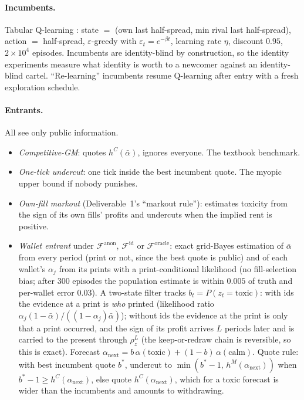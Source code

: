 \documentclass[11pt]{article}
\newcommand{\Fanon}{\mathcal{F}^{\mathrm{anon}}}
\newcommand{\Fid}{\mathcal{F}^{\mathrm{id}}}
\newcommand{\For}{\mathcal{F}^{\mathrm{oracle}}}
\begin{document}
\paragraph{Incumbents.} Tabular Q-learning \cite{calvano,cfl}: state $=$ (own last half-spread, min rival last half-spread), action $=$ half-spread, $\varepsilon$-greedy with $\varepsilon_t=e^{-\beta t}$, learning rate $\eta$, discount $0.95$, $2\times10^4$ episodes. Incumbents are identity-blind by construction, so the identity experiments measure what identity is worth to a newcomer against an identity-blind cartel. ``Re-learning'' incumbents resume Q-learning after entry with a fresh exploration schedule.

\paragraph{Entrants.} All see only public information.
\begin{itemize}
\item \emph{Competitive-GM}: quotes $h^C(\bar\alpha)$, ignores everyone. The textbook benchmark.
\item \emph{One-tick undercut}: one tick inside the best incumbent quote. The myopic upper bound if nobody punishes.
\item \emph{Own-fill markout} (Deliverable~1's ``markout rule''): estimates toxicity from the sign of its own fills' profits and undercuts when the implied rent is positive.
\item \emph{Wallet entrant} under $\Fanon$, $\Fid$ or $\For$: exact grid-Bayes estimation of $\bar\alpha$ from every period (print or not, since the best quote is public) and of each wallet's $\alpha_j$ from its prints with a print-conditional likelihood (no fill-selection bias; after 300 episodes the population estimate is within $0.005$ of truth and per-wallet error $0.03$). A two-state filter tracks $b_t=P(z_t=\text{toxic})$: with ids the evidence at a print is \emph{who} printed (likelihood ratio $\alpha_j(1-\bar\alpha)/((1-\alpha_j)\bar\alpha)$); without ids the evidence at the print is only that a print occurred, and the sign of its profit arrives $L$ periods later and is carried to the present through $\rho_z^{L}$ (the keep-or-redraw chain is reversible, so this is exact). Forecast $\alpha_{\mathrm{next}}=b\,\alpha(\text{toxic})+(1-b)\,\alpha(\text{calm})$. Quote rule: with best incumbent quote $b^*$, undercut to $\min(b^*-1,\,h^M(\alpha_{\mathrm{next}}))$ when $b^*-1\ge h^C(\alpha_{\mathrm{next}})$, else quote $h^C(\alpha_{\mathrm{next}})$, which for a toxic forecast is wider than the incumbents and amounts to withdrawing.
\end{itemize}
\end{document}
